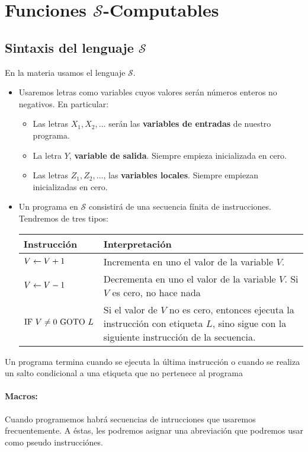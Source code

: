 \section{Funciones $\mathcal{S}$-Computables}
	
	\subsection{Sintaxis del lenguaje $\mathcal{S}$}
	
	En la materia usamos el lenguaje $\mathcal{S}$.
	\begin{itemize}
		\item Usaremos letras como variables cuyos valores serán números enteros no negativos. En particular:
		\begin{itemize}
			\item Las letras $X_1, X_2,\dots$ serán las \textbf{variables de entradas} de nuestro programa.
			\item La letra $Y$, \textbf{variable de salida}. Siempre empieza inicializada en cero.
			\item Las letras $Z_1,Z_2,\dots$, las \textbf{variables locales}. Siempre empiezan inicializadas en cero.
		\end{itemize}
	\item Un programa en $\mathcal{S}$ consistirá de una secuencia fínita de instrucciones. Tendremos de tres tipos:
	
	\begin{center}
	\begin{tabularx}{0.9\textwidth}{p{} X}
		Instrucción & Interpretación \\
		\hline
		$V \leftarrow V + 1$ & Incrementa en uno el valor de la variable $V$. \\
		$V \leftarrow V - 1$ & Decrementa en uno el valor de la variable $V$. Si $V$ es cero, no hace nada\\
		$\text{IF }V \neq 0 \text{ GOTO } L$  & Si el valor de $V$ no es cero, entonces ejecuta la  instrucción con etiqueta $L$, sino sigue con la siguiente instrucción de la secuencia.
	\end{tabularx}
	\end{center}
	\end{itemize}

Un programa termina cuando se ejecuta la última instrucción o cuando se realiza un salto condicional a una etiqueta que no pertenece al programa
	\paragraph{Macros:} Cuando programemos habrá secuencias de intrucciones que usaremos frecuentemente. A éstas, les podremos asignar una abreviación que podremos usar como pseudo instrucciónes.
	
